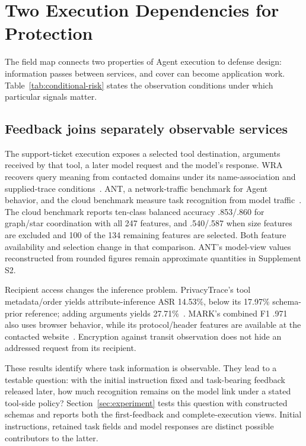 \section{Two Execution Dependencies for Protection}\label{sec:evidence}
The field map connects two properties of Agent execution to defense design: information passes between services, and cover can become application work. Table~\ref{tab:conditional-risk} states the observation conditions under which particular signals matter.

\subsection{Feedback joins separately observable services}\label{sec:authorization}
The support-ticket execution exposes a selected tool destination, arguments received by that tool, a later model request and the model's response. WRA recovers query meaning from contacted domains under its name-association and supplied-trace conditions~\cite{jeong2026wra}. ANT, a network-traffic benchmark for Agent behavior, and the cloud benchmark measure task recognition from model traffic~\cite{li2026ant,pouryousef2026traffic}. The cloud benchmark reports ten-class balanced accuracy .853/.860 for graph/star coordination with all 247 features, and .540/.587 when size features are excluded and 100 of the 134 remaining features are selected. Both feature availability and selection change in that comparison. ANT's model-view values reconstructed from rounded figures remain approximate quantities in Supplement S2.



Recipient access changes the inference problem. PrivacyTrace's tool metadata/order yields attribute-inference ASR 14.53\%, below its 17.97\% schema-prior reference; adding arguments yields 27.71\%~\cite{duan2026privacytrace}. MARK's combined F1 .971 also uses browser behavior, while its protocol/header features are available at the contacted website~\cite{kang2026whoseagent}. Encryption against transit observation does not hide an addressed request from its recipient.

These results identify where task information is observable. They lead to a testable question: with the initial instruction fixed and task-bearing feedback released later, how much recognition remains on the model link under a stated tool-side policy? Section~\ref{sec:experiment} tests this question with constructed schemas and reports both the first-feedback and complete-execution views. Initial instructions, retained task fields and model responses are distinct possible contributors to the latter.

